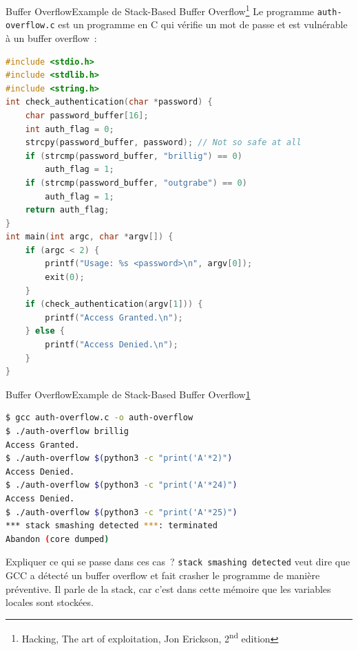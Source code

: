 \documentclass{beamer}
\begin{document}
    \begin{frame}[fragile]{Buffer Overflow}{Example de Stack-Based Buffer Overflow\footnote{\label{hacking}Hacking, The art of exploitation, Jon Erickson, 2\textsuperscript{nd} edition}}
        Le programme \lstinline{auth-overflow.c} est un programme en C qui vérifie un mot de passe et est vulnérable à un buffer overflow~:
        \begin{lstlisting}[language=C,basicstyle=\tiny\ttfamily]
#include <stdio.h>
#include <stdlib.h>
#include <string.h>
int check_authentication(char *password) {
    char password_buffer[16];
    int auth_flag = 0;
    strcpy(password_buffer, password); // Not so safe at all
    if (strcmp(password_buffer, "brillig") == 0)
        auth_flag = 1;
    if (strcmp(password_buffer, "outgrabe") == 0)
        auth_flag = 1;
    return auth_flag;
}
int main(int argc, char *argv[]) {
    if (argc < 2) {
        printf("Usage: %s <password>\n", argv[0]);
        exit(0);
    }
    if (check_authentication(argv[1])) {
        printf("Access Granted.\n");
    } else {
        printf("Access Denied.\n");
    }
}
        \end{lstlisting}
    \end{frame}

    \begin{frame}[fragile]{Buffer Overflow}{Example de Stack-Based Buffer Overflow\cref{hacking}}
        \begin{lstlisting}[language=bash]
$ gcc auth-overflow.c -o auth-overflow
$ ./auth-overflow brillig
Access Granted.
$ ./auth-overflow $(python3 -c "print('A'*2)")
Access Denied.
$ ./auth-overflow $(python3 -c "print('A'*24)")
Access Denied.
$ ./auth-overflow $(python3 -c "print('A'*25)")
*** stack smashing detected ***: terminated
Abandon (core dumped)
        \end{lstlisting}
        Expliquer ce qui se passe dans ces cas~?
        \pause
        \bigbreak
        \lstinline{stack smashing detected} veut dire que GCC a détecté un buffer overflow et fait crasher le programme de manière préventive.
        Il parle de la stack, car c'est dans cette mémoire que les variables locales sont stockées.
    \end{frame}
\end{document}
